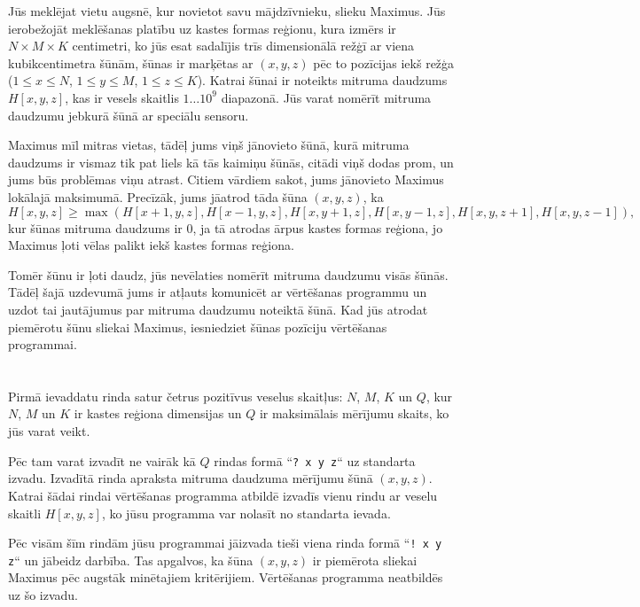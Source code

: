 \ifx\boi\undefined\fi
\def\version{jury-1}

Jūs meklējat vietu augsnē, kur novietot savu mājdzīvnieku, slieku Maximus.
Jūs ierobežojāt meklēšanas platību uz kastes formas reģionu, kura izmērs ir $N \times M \times K$ centimetri,
ko jūs esat sadalījis trīs dimensionālā režģī ar viena kubikcentimetra šūnām,
šūnas ir marķētas ar $(x, y, z)$ pēc to pozīcijas iekš režģa ($1 \le x \le N$, $1 \le y \le M$, $1 \le z \le K$).
Katrai šūnai ir noteikts mitruma daudzums $H[x,y,z]$, kas ir vesels skaitlis $1 \dots 10^9$ diapazonā.
Jūs varat nomērīt mitruma daudzumu jebkurā šūnā ar speciālu sensoru.

Maximus mīl mitras vietas, tādēļ jums viņš jānovieto šūnā, kurā mitruma daudzums ir vismaz tik pat liels kā tās kaimiņu šūnās,
citādi viņš dodas prom, un jums būs problēmas viņu atrast.
Citiem vārdiem sakot, jums jānovieto Maximus lokālajā maksimumā.
Precīzāk, jums jāatrod tāda šūna $(x,y,z)$, ka
$$
H[x,y,z] \ge \max(H[x+1,y,z], H[x-1,y,z], H[x,y+1,z], H[x,y-1,z], H[x,y,z+1], H[x,y,z-1]),
$$
kur šūnas mitruma daudzums ir $0$, ja tā atrodas ārpus kastes formas reģiona, jo Maximus ļoti vēlas palikt iekš kastes formas reģiona.

Tomēr šūnu ir ļoti daudz, jūs nevēlaties nomērīt mitruma daudzumu visās šūnās.
Tādēļ šajā uzdevumā jums ir atļauts komunicēt ar vērtēšanas programmu un uzdot tai jautājumus par mitruma daudzumu noteiktā šūnā.
Kad jūs atrodat piemērotu šūnu sliekai Maximus, iesniedziet šūnas pozīciju vērtēšanas programmai.

\section*{\interactivity}
Pirmā ievaddatu rinda satur četrus pozitīvus veselus skaitļus: $N$, $M$, $K$ un $Q$,
kur $N$, $M$ un $K$ ir kastes reģiona dimensijas un $Q$ ir maksimālais mērījumu skaits, ko jūs varat veikt.

Pēc tam varat izvadīt ne vairāk kā $Q$ rindas formā ``\texttt{?\ x y z}`` uz standarta izvadu.
Izvadītā rinda apraksta mitruma daudzuma mērījumu šūnā $(x, y, z)$.
Katrai šādai rindai vērtēšanas programma atbildē izvadīs vienu rindu ar veselu skaitli $H[x,y,z]$,
ko jūsu programma var nolasīt no standarta ievada.

Pēc visām šīm rindām jūsu programmai jāizvada tieši viena rinda formā ``\texttt{!\ x y z}`` un jābeidz darbība.
Tas apgalvos, ka šūna $(x, y, z)$ ir piemērota sliekai Maximus pēc augstāk minētajiem kritērijiem.
Vērtēšanas programma neatbildēs uz šo izvadu.


